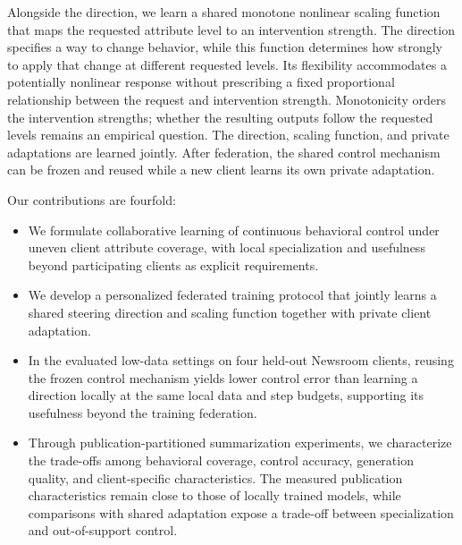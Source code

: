 \documentclass[11pt]{article}
\begin{document}
Alongside the direction, we learn a shared monotone nonlinear scaling function that maps the requested attribute level to an intervention strength.
The direction specifies a way to change behavior, while this function determines how strongly to apply that change at different requested levels.
Its flexibility accommodates a potentially nonlinear response without prescribing a fixed proportional relationship between the request and intervention strength.
Monotonicity orders the intervention strengths; whether the resulting outputs follow the requested levels remains an empirical question.
The direction, scaling function, and private adaptations are learned jointly.
After federation, the shared control mechanism can be frozen and reused while a new client learns its own private adaptation.

Our contributions are fourfold:
\begin{itemize}
    \item We formulate collaborative learning of continuous behavioral control under uneven client attribute coverage, with local specialization and usefulness beyond participating clients as explicit requirements.
    \item We develop a personalized federated training protocol that jointly learns a shared steering direction and scaling function together with private client adaptation.
    \item In the evaluated low-data settings on four held-out Newsroom clients, reusing the frozen control mechanism yields lower control error than learning a direction locally at the same local data and step budgets, supporting its usefulness beyond the training federation.
    \item Through publication-partitioned summarization experiments, we characterize the trade-offs among behavioral coverage, control accuracy, generation quality, and client-specific characteristics. The measured publication characteristics remain close to those of locally trained models, while comparisons with shared adaptation expose a trade-off between specialization and out-of-support control.
\end{itemize}



\end{document}

